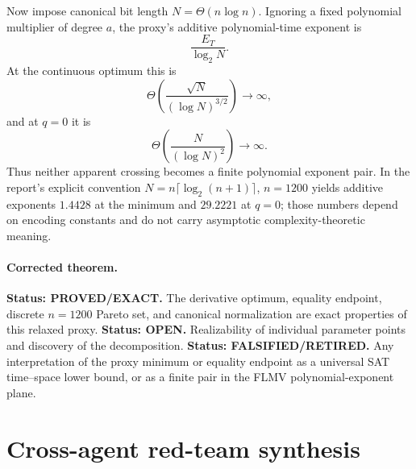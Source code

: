 \documentclass[11pt]{article}
\newcommand{\Status}[1]{\textbf{Status: #1.}}
\begin{document}
Now impose canonical bit length $N=\Theta(n\log n)$.  Ignoring a fixed polynomial multiplier of
degree $a$, the proxy's additive polynomial-time exponent is
\[
 \frac{E_T}{\log_2 N}.
\]
At the continuous optimum this is
\[
 \Theta\!\left(\frac{\sqrt{N}}{(\log N)^{3/2}}\right)\longrightarrow\infty,
\]
and at $q=0$ it is
\[
 \Theta\!\left(\frac{N}{(\log N)^2}\right)\longrightarrow\infty.
\]
Thus neither apparent crossing becomes a finite polynomial exponent pair.  In the report's explicit
convention $N=n\lceil\log_2(n+1)\rceil$, $n=1200$ yields additive exponents $1.4428$ at the minimum
and $29.2221$ at $q=0$; those numbers depend on encoding constants and do not carry asymptotic
complexity-theoretic meaning.

\paragraph{Corrected theorem.}
\Status{PROVED/EXACT} The derivative optimum, equality endpoint, discrete $n=1200$ Pareto set, and
canonical normalization are exact properties of this relaxed proxy.  \Status{OPEN} Realizability of
individual parameter points and discovery of the decomposition.  \Status{FALSIFIED/RETIRED} Any
interpretation of the proxy minimum or equality endpoint as a universal SAT time--space lower bound,
or as a finite pair in the FLMV polynomial-exponent plane.

\section{Cross-agent red-team synthesis}
\end{document}
